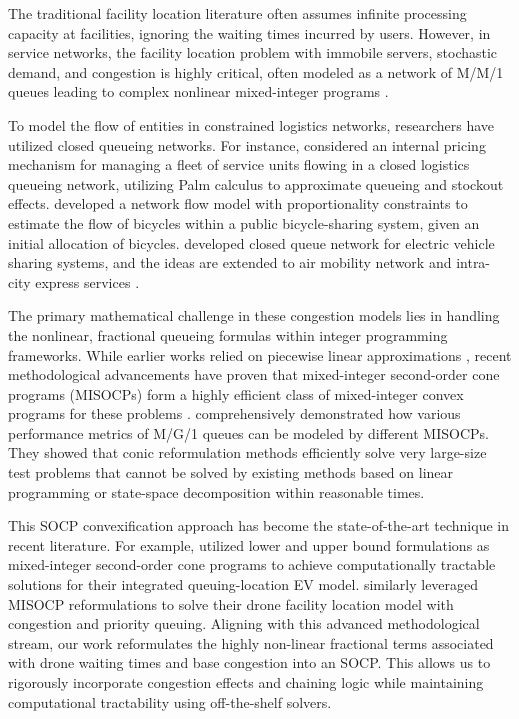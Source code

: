 \documentclass[final,3p,authoryear]{elsarticle}
\begin{document}
The traditional facility location literature often assumes infinite processing capacity at facilities, ignoring the waiting times incurred by users.
However, in service networks, the facility location problem with immobile servers, stochastic demand, and congestion is highly critical, often modeled as a network of M/M/1 queues leading to complex nonlinear mixed-integer programs \citep{elhedhliServiceSystem2006M&SOM}.

To model the flow of entities in constrained logistics networks, researchers have utilized closed queueing networks.
For instance, \citet{adelmanPriceDirectedControl2007OperationsResearch} considered an internal pricing mechanism for managing a fleet of service units flowing in a closed logistics queueing network, utilizing Palm calculus to approximate queueing and stockout effects.
\citet{shuModelsEffective2013OperationsResearch} developed a network flow model with proportionality constraints to estimate the flow of bicycles within a public bicycle-sharing system, given an initial allocation of bicycles.
\citet{heServiceRegion2017M&SOM} developed closed queue network for electric vehicle sharing systems, and the ideas are extended to air mobility network \citep{wangVertiportPlanning2022M&SOM,wangUrbanAir2025TRE} and intra-city express services \citep{chenCoordinatedDroneCourier2025}.

The primary mathematical challenge in these congestion models lies in handling the nonlinear, fractional queueing formulas within integer programming frameworks.
While earlier works relied on piecewise linear approximations \citep{elhedhliServiceSystem2006M&SOM}, recent methodological advancements have proven that mixed-integer second-order cone programs (MISOCPs) form a highly efficient class of mixed-integer convex programs for these problems \citep{ahmadi-javidConvexificationQueueing2022INFORMSJournalonComputing}.
\citet{ahmadi-javidConvexificationQueueing2022INFORMSJournalonComputing} comprehensively demonstrated how various performance metrics of M/G/1 queues can be modeled by different MISOCPs.
They showed that conic reformulation methods efficiently solve very large-size test problems that cannot be solved by existing methods based on linear programming or state-space decomposition within reasonable times.

This SOCP convexification approach has become the state-of-the-art technique in recent literature.
For example, \citet{heChargingElectric2020M&SOM} utilized lower and upper bound formulations as mixed-integer second-order cone programs to achieve computationally tractable solutions for their integrated queuing-location EV model.
\citet{wangFacilityLocation2022} similarly leveraged MISOCP reformulations to solve their drone facility location model with congestion and priority queuing.
Aligning with this advanced methodological stream, our work reformulates the highly non-linear fractional terms associated with drone waiting times and base congestion into an SOCP.
This allows us to rigorously incorporate congestion effects and chaining logic while maintaining computational tractability using off-the-shelf solvers.
\end{document}
